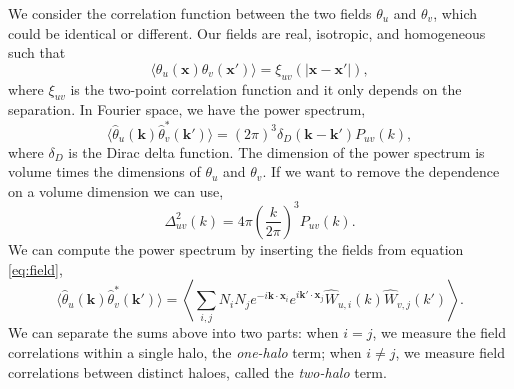 We consider the correlation function between the two fields $\theta_u$ and $\theta_v$, which could be identical or different. Our fields are real, isotropic, and homogeneous such that
\begin{equation}
    \langle\theta_u(\bm{x})\theta_v(\bm{x}')\rangle = \xi_{uv}(|\bm{x} - \bm{x}'|),
\end{equation}
where $\xi_{uv}$ is the two-point correlation function and it only depends on the separation. In Fourier space, we have the power spectrum,
\begin{equation}
    \langle\hat{\theta}_u(\bm{k})\hat{\theta}^*_v(\bm{k}')\rangle = (2\pi)^3 \delta_D(\bm{k}-\bm{k}')P_{uv}(k),
\end{equation}
where $\delta_D$ is the Dirac delta function. The dimension of the power spectrum is volume times the dimensions of $\theta_u$ and $\theta_v$. If we want to remove the dependence on a volume dimension we can use,
\begin{equation}
    \Delta^2_{uv}(k) = 4\pi \left(\frac{k}{2\pi}\right)^3 P_{uv}(k).
\end{equation}
We can compute the power spectrum by inserting the fields from equation \ref{eq:field},
\begin{equation}
    \langle\hat{\theta}_u(\bm{k})\hat{\theta}^*_v(\bm{k}')\rangle = \left\langle\sum_{i,j} N_i N_j e^{-i \bm{k} \cdot \bm{x}_i} e^{i \bm{k}' \cdot \bm{x}_j} \hat{W}_{u, i}(k) \hat{W}_{v, j}(k')\right\rangle.
\end{equation}
We can separate the sums above into two parts: when $i=j$, we measure the field correlations within a single halo, the \emph{one-halo} term; when $i\neq j$, we measure field correlations between distinct haloes, called the \emph{two-halo} term.

